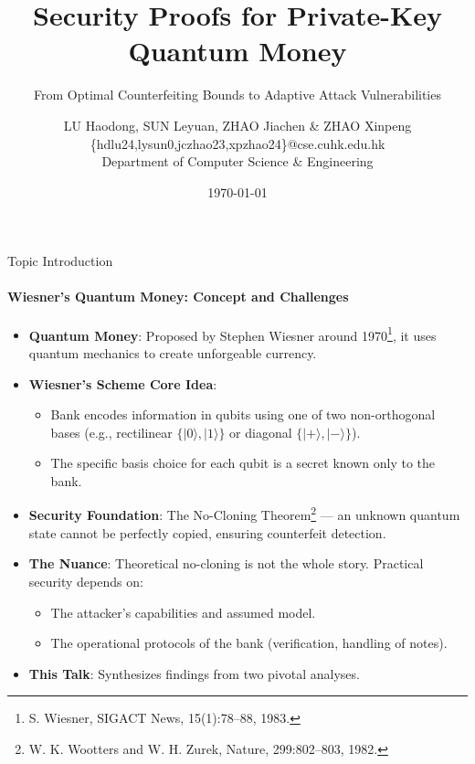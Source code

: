 \documentclass{beamer}
\title[Wiesner's QM Security]{Security Proofs for Private-Key Quantum Money}
\subtitle{From Optimal Counterfeiting Bounds to Adaptive Attack Vulnerabilities}
\author[Your Short Name]{
    LU Haodong, SUN Leyuan, ZHAO Jiachen \& ZHAO Xinpeng \\
    \vspace{0.1in}
    \footnotesize{\{hdlu24,lysun0,jczhao23,xpzhao24\}@cse.cuhk.edu.hk} \\
    \footnotesize{Department of Computer Science \& Engineering}}
\institute[CUHK]{The Chinese University of Hong Kong}
\date{\today}
\begin{document}
\frame[plain]{\maketitle}


\begin{frame}{Topic Introduction}
    \framesubtitle{Wiesner's Quantum Money: Concept and Challenges}
    \begin{itemize}
        \item \textbf{Quantum Money}: Proposed by Stephen Wiesner around 1970\footnote{S. Wiesner, SIGACT News, 15(1):78–88, 1983.}, it uses quantum mechanics to create unforgeable currency.
        \pause
        \item \textbf{Wiesner's Scheme Core Idea}:
            \begin{itemize}
                \item Bank encodes information in qubits using one of two non-orthogonal bases (e.g., rectilinear $\{|0\rangle, |1\rangle\}$ or diagonal $\{|+\rangle, |-\rangle\}$).
                \item The specific basis choice for each qubit is a secret known only to the bank.
            \end{itemize}
        \pause
        \item \textbf{Security Foundation}: The No-Cloning Theorem\footnote{W. K. Wootters and W. H. Zurek, Nature, 299:802–803, 1982.} --- an unknown quantum state cannot be perfectly copied, ensuring counterfeit detection.
        \pause
        \item \textbf{The Nuance}: Theoretical no-cloning is not the whole story. Practical security depends on:
            \begin{itemize}
                \item The attacker's capabilities and assumed model.
                \item The operational protocols of the bank (verification, handling of notes).
            \end{itemize}
        \pause
        \item \textbf{This Talk}: Synthesizes findings from two pivotal analyses.
    \end{itemize}
\end{frame}
\end{document}
